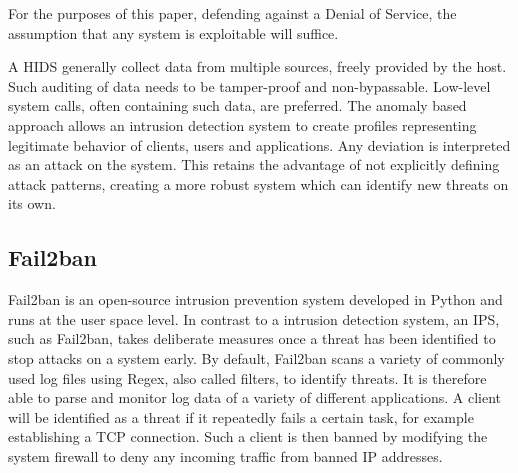For the purposes of this paper, defending against a Denial of Service, the assumption that any system is exploitable will suffice.

A \ac{HIDS} generally collect data from multiple sources, freely provided by the host.
Such auditing of data needs to be tamper-proof and non-bypassable.
Low-level system calls, often containing such data, are preferred.
The anomaly based approach allows an intrusion detection system to create profiles representing legitimate behavior of clients, users and applications.
Any deviation is interpreted as an attack on the system.
This retains the advantage of not explicitly defining attack patterns, creating a more robust system which can identify new threats on its own.\cite{HIDPS}

\subsection{Fail2ban}
Fail2ban is an open-source intrusion prevention system developed in Python and runs at the user space level.
In contrast to a intrusion detection system, an \ac{IPS}, such as Fail2ban, takes deliberate measures once a threat has been identified to stop attacks on a system early.
By default, Fail2ban scans a variety of commonly used log files using \ac{Regex}, also called filters, to identify threats.
It is therefore able to parse and monitor log data of a variety of different applications.
A client will be identified as a threat if it repeatedly fails a certain task, for example establishing a \ac{TCP} connection.
Such a client is then banned by modifying the system firewall to deny any incoming traffic from banned \ac{IP} addresses.\cite{git:fail2ban}

